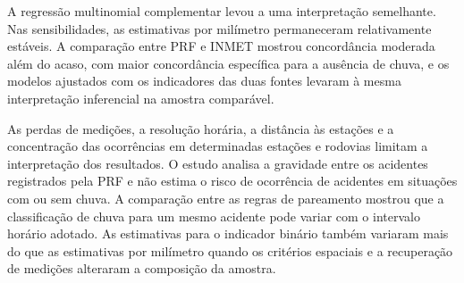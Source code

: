 \documentclass[12pt]{article}
\begin{document}
A regressão multinomial complementar levou a uma interpretação semelhante.
Nas sensibilidades, as estimativas por milímetro permaneceram relativamente estáveis.
A comparação entre PRF e INMET mostrou concordância moderada além do acaso,
com maior concordância específica para a ausência de chuva, e os modelos
ajustados com os indicadores das duas fontes levaram à mesma interpretação
inferencial na amostra comparável.

As perdas de medições, a resolução horária, a distância às estações e a
concentração das ocorrências em determinadas estações e rodovias limitam
a interpretação dos resultados. O estudo analisa a gravidade entre os
acidentes registrados pela PRF e não estima o risco de ocorrência de
acidentes em situações com ou sem chuva. A comparação entre as regras de
pareamento mostrou que a classificação de chuva para um mesmo acidente pode
variar com o intervalo horário adotado. As estimativas para o indicador
binário também variaram mais do que as estimativas por milímetro quando os
critérios espaciais e a recuperação de medições alteraram a composição da
amostra.

\begingroup
\raggedright


\endgroup
\end{document}
